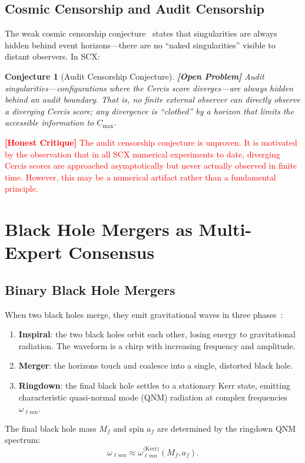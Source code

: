 \documentclass[12pt,a4paper]{article}
\newtheorem{conjecture}[theorem]{Conjecture}
\theoremstyle{remark}
\newcommand{\SCX}{\textsf{SCX}}
\newcommand{\Cercis}{\textsf{Cercis}}
\newcommand{\openproblem}{\textbf{[Open Problem]}}
\newcommand{\honestcrit}[1]{\textcolor{red}{\textbf{[Honest Critique]} #1}}
\begin{document}
\subsection{Cosmic Censorship and Audit Censorship}

The weak cosmic censorship conjecture~\cite{penrose1969gravitational} states that singularities are always hidden behind event horizons---there are no ``naked singularities'' visible to distant observers. In \SCX{}:

\begin{conjecture}[Audit Censorship Conjecture]
\label{conj:audit_censorship}
\openproblem
Audit singularities---configurations where the \Cercis{} score diverges---are always hidden behind an audit boundary. That is, no finite external observer can directly observe a diverging \Cercis{} score; any divergence is ``clothed'' by a horizon that limits the accessible information to $C_{\max}$.
\end{conjecture}

\honestcrit{The audit censorship conjecture is unproven. It is motivated by the observation that in all \SCX{} numerical experiments to date, diverging \Cercis{} scores are approached asymptotically but never actually observed in finite time. However, this may be a numerical artifact rather than a fundamental principle.}


\section{Black Hole Mergers as Multi-Expert Consensus}
\label{sec:merger}

\subsection{Binary Black Hole Mergers}

When two black holes merge, they emit gravitational waves in three phases~\cite{abbott2016observation}:
\begin{enumerate}[leftmargin=*, label=(\arabic*)]
  \item \textbf{Inspiral}: the two black holes orbit each other, losing energy to gravitational radiation. The waveform is a chirp with increasing frequency and amplitude.
  \item \textbf{Merger}: the horizons touch and coalesce into a single, distorted black hole.
  \item \textbf{Ringdown}: the final black hole settles to a stationary Kerr state, emitting characteristic quasi-normal mode (QNM) radiation at complex frequencies $\omega_{\ell mn}$.
\end{enumerate}
The final black hole mass $M_f$ and spin $a_f$ are determined by the ringdown QNM spectrum:
\begin{equation}
  \omega_{\ell mn} \approx \omega_{\ell mn}^{\text{(Kerr)}}(M_f, a_f).
\end{equation}
\end{document}
